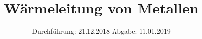 

\subject{V204}
\title{Wärmeleitung von Metallen}
\date{
  Durchführung: 21.12.2018
  \hspace{3em}
  Abgabe: 11.01.2019
}



\maketitle
\thispagestyle{empty}
\tableofcontents
\newpage




 
 


\printbibliography{}

